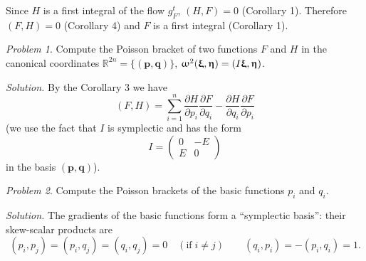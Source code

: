 \documentclass[leqno]{report}
\renewcommand{\pmb}[1]{{
  \renewcommand{\alpha}{\upalpha}
  \renewcommand{\beta}{\upbeta}
  \renewcommand{\gamma}{\upgamma}
  \renewcommand{\delta}{\updelta}
  \renewcommand{\epsilon}{\upepsilon}
  \renewcommand{\varepsilon}{\upvarepsilon}
  \renewcommand{\zeta}{\upzeta}
  \renewcommand{\eta}{\upeta}
  \renewcommand{\theta}{\uptheta}
  \renewcommand{\iota}{\upiota}
  \renewcommand{\kappa}{\upkappa}
  \renewcommand{\lambda}{\uplambda}
  \renewcommand{\mu}{\upmu}
  \renewcommand{\nu}{\upnu}
  \renewcommand{\xi}{\upxi}
  \renewcommand{\pi}{\uppi}
  \renewcommand{\rho}{\uprho}
  \renewcommand{\sigma}{\upsigma}
  \renewcommand{\tau}{\uptau}
  \renewcommand{\upsilon}{\upupsilon}
  \renewcommand{\varphi}{\upvarphi}
  \renewcommand{\phi}{\upphi}
  \renewcommand{\chi}{\upchi}
  \renewcommand{\psi}{\uppsi}
  \renewcommand{\omega}{\upomega}
  \boldsymbol{#1}
}}
\numberwithin{equation}{section}
\theoremstyle{plain}
\let\oldendproof\endproof
\renewenvironment{proof}[1][\proofname]{%
  \oldproof[\textsc{#1}]%
}{\oldendproof}
\theoremstyle{definition}
\theoremstyle{remark}
\theoremstyle{smallcap}
\newtheorem{prob}{Problem}
\numberwithin{prob}{section}
\newcommand{\solution}[1]{\textit{Solution.} #1}
\begin{document}
\begin{proof}
  Since $H$ is a first integral of the flow $g_F^t$,
  $(H, F) = 0$ (Corollary 1).
  Therefore $(F, H) = 0$ (Corollary 4)
  and $F$ is a first integral (Corollary 1).

\end{proof}

\begin{prob}
  Compute the Poisson bracket of two functions $F$ and $H$
  in the canonical coordinates
  $\mathbb R^{2n} = \{(\mathbf p, \mathbf q)\}$,
  $\omega^2(\pmb\xi, \pmb\eta) = (I\pmb\xi, \pmb\eta)$.

  \solution{
    By the Corollary 3 we have
    $$
    (F, H) =
    \sum_{i = 1}^n
      \frac{ \partial H } { \partial p_i } \frac{ \partial F } { \partial q_i }
      -
      \frac{ \partial H } { \partial q_i } \frac{ \partial F } { \partial p_i }
    $$
    (we use the fact that $I$ is symplectic and has the form
    $$
    I = \left(\begin{array}{ccc}
        0 & -E \\
        E & 0
    \end{array}\right)
    $$
    in the basis $(\mathbf p, \mathbf q)$).
  }
\end{prob}

\begin{prob}
  Compute the Poisson brackets of the basic functions $p_i$ and $q_i$.

  \solution{
    The gradients of the basic functions form a ``symplectic basis'':
    their skew-scalar products are
    $$
    (p_i, p_j) = (p_i, q_j) = (q_i, q_j) = 0 \quad (\mathrm{if}\; i\ne j)
    \qquad
    (q_i, p_i) = -(p_i, q_i) = 1.
    $$
  }
\end{prob}
\end{document}
